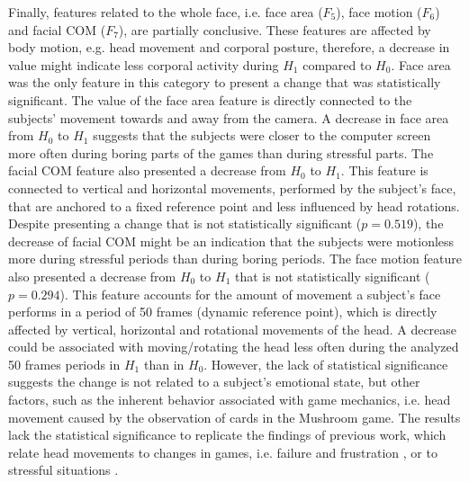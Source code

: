 Finally, features related to the whole face, i.e. face area ($F_5$), face motion ($F_6$) and facial COM ($F_7$), are partially conclusive. These features are affected by body motion, e.g. head movement and corporal posture, therefore, a decrease in value might indicate less corporal activity during $H_1$ compared to $H_0$. Face area was the only feature in this category to present a change that was statistically significant. The value of the face area feature is directly connected to the subjects' movement towards and away from the camera. A decrease in face area from $H_0$ to $H_1$ suggests that the subjects were closer to the computer screen more often during boring parts of the games than during stressful parts. The facial COM feature also presented a decrease from $H_0$ to $H_1$. This feature is connected to vertical and horizontal movements, performed by the subject's face, that are anchored to a fixed reference point and less influenced by head rotations. Despite presenting a change that is not statistically significant ($p = 0.519$), the decrease of facial COM might be an indication that the subjects were motionless more during stressful periods than during boring periods. The face motion feature also presented a decrease from $H_0$ to $H_1$ that is not statistically significant ($p = 0.294$). This feature accounts for the amount of movement a subject's face performs in a period of 50 frames (dynamic reference point), which is directly affected by vertical, horizontal and rotational movements of the head. A decrease could be associated with moving/rotating the head less often during the analyzed 50 frames periods in $H_1$ than in $H_0$. However, the lack of statistical significance suggests the change is not related to a subject's emotional state, but other factors, such as the inherent behavior associated with game mechanics, i.e. head movement caused by the observation of cards in the Mushroom game. The results lack the statistical significance to replicate the findings of previous work, which relate head movements to changes in games, i.e. failure \parencite{shaker2011game} and frustration \parencite{blom2014towards}, or to stressful situations \parencite{giannakakis2017stress}.

